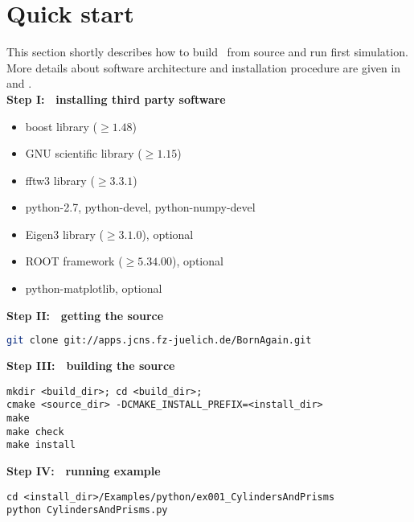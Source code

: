\newpage
\section{Quick start} 

This section shortly describes how to build \BornAgain\ from source and run first
simulation. More details about software architecture and installation
procedure are given in  and . \\

\noindent
{\bf Step I: $~$ installing third party software}
\begin{itemize}
\item boost library ($\geq 1.48$)
\item GNU scientific library ($\geq 1.15$)
\item fftw3 library ($\geq 3.3.1$)
\item python-2.7, python-devel, python-numpy-devel
\item Eigen3 library ($\geq 3.1.0$), optional
\item ROOT framework ($\geq 5.34.00$), optional
\item python-matplotlib, optional
\end{itemize}
\vspace*{2mm}


\noindent
{\bf Step II: $~$ getting the source}
\begin{lstlisting}[language=bash, style=commandline]
git clone git://apps.jcns.fz-juelich.de/BornAgain.git 
\end{lstlisting}
\vspace*{3mm}


\noindent
{\bf Step III: $~$ building the source}
\begin{lstlisting}[language=shell, style=commandline]
mkdir <build_dir>; cd <build_dir>;
cmake <source_dir> -DCMAKE_INSTALL_PREFIX=<install_dir>
make
make check
make install
\end{lstlisting}
\vspace*{3mm}


\noindent
{\bf Step IV: $~$ running example}
\begin{lstlisting}[language=shell, style=commandline]
cd <install_dir>/Examples/python/ex001_CylindersAndPrisms
python CylindersAndPrisms.py
\end{lstlisting}




